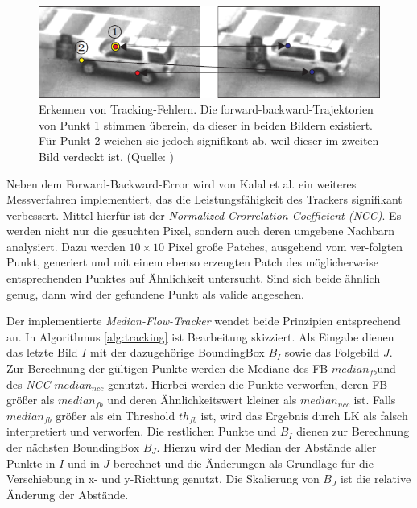 	\begin{figure}
	\begin{centering}
	\includegraphics[scale=0.7]{../pictures/MediaFlow.png}
	\par\end{centering}

	\caption[Erkennen von Tracking-Fehlern]{Erkennen von Tracking-Fehlern. Die forward-backward-Trajektorien von {Punkt 1} stimmen überein, da dieser in beiden Bildern existiert. Für Punkt 2 weichen sie jedoch signifikant ab, weil dieser im zweiten Bild verdeckt ist. (Quelle: \cite{MFT})\label{fig:Prinzip-des-Media}}
	\end{figure}

	Neben dem Forward-Backward-Error wird von Kalal et al.\cite{TLD} ein weiteres Messverfahren implementiert, das die Leistungsfähigkeit des Trackers signifikant verbessert\cite{MFT}. Mittel hierfür ist der \textit{Normalized Crorrelation Coefficient (NCC)}. Es werden nicht nur die gesuchten Pixel, sondern auch deren umgebene Nachbarn analysiert. Dazu werden $10\times10$ Pixel große Patches, ausgehend vom ver-folgten Punkt, generiert und mit einem ebenso erzeugten Patch des möglicherweise entsprechenden Punktes auf Ähnlichkeit untersucht. Sind sich beide ähnlich genug, dann wird der gefundene Punkt als valide angesehen.

	Der implementierte \textit{Median-Flow-Tracker} wendet beide Prinzipien entsprechend \cite{key-5} an. In Algorithmus \ref{alg:tracking} ist Bearbeitung skizziert. Als Eingabe dienen das letzte Bild $I$ mit der dazugehörige BoundingBox $B_{I}$ sowie das Folgebild $J$. Zur Berechnung der gültigen Punkte werden die Mediane des FB $median_{fb}$und des \textit{NCC} $median_{ncc}$ genutzt. Hierbei werden die Punkte verworfen, deren FB größer als $median_{fb}$ und deren Ähnlichkeitswert kleiner als $median_{ncc}$ ist. Falls $median_{fb}$ größer als ein Threshold $th_{fb}$ ist, wird das Ergebnis durch LK als falsch interpretiert und verworfen. Die restlichen Punkte und $B_{I}$ dienen zur Berechnung der nächsten BoundingBox $B_{J}$. Hierzu wird der Median der Abstände aller Punkte in $I$ und in $J$ berechnet und die Änderungen als Grundlage für die Verschiebung in x- und y-Richtung genutzt. Die Skalierung von $B_{J}$ ist die relative Änderung der Abstände.

